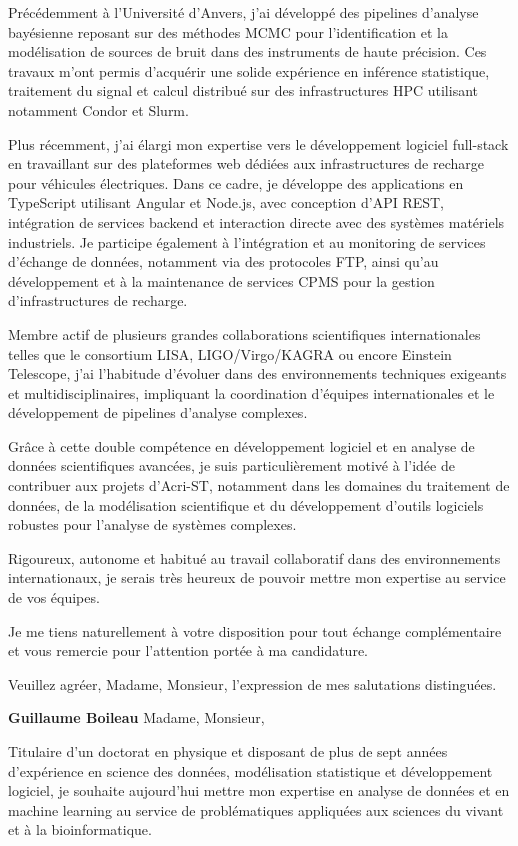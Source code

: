 \documentclass[10pt,a4paper]{altacv}
\begin{document}
Précédemment à l’Université d’Anvers, j’ai développé des pipelines d’analyse bayésienne reposant sur des méthodes MCMC pour l’identification et la modélisation de sources de bruit dans des instruments de haute précision. Ces travaux m’ont permis d’acquérir une solide expérience en inférence statistique, traitement du signal et calcul distribué sur des infrastructures HPC utilisant notamment Condor et Slurm.

Plus récemment, j’ai élargi mon expertise vers le développement logiciel full-stack en travaillant sur des plateformes web dédiées aux infrastructures de recharge pour véhicules électriques. Dans ce cadre, je développe des applications en TypeScript utilisant Angular et Node.js, avec conception d’API REST, intégration de services backend et interaction directe avec des systèmes matériels industriels. Je participe également à l’intégration et au monitoring de services d’échange de données, notamment via des protocoles FTP, ainsi qu’au développement et à la maintenance de services CPMS pour la gestion d’infrastructures de recharge.

Membre actif de plusieurs grandes collaborations scientifiques internationales telles que le consortium LISA, LIGO/Virgo/KAGRA ou encore Einstein Telescope, j’ai l’habitude d’évoluer dans des environnements techniques exigeants et multidisciplinaires, impliquant la coordination d’équipes internationales et le développement de pipelines d’analyse complexes.

Grâce à cette double compétence en développement logiciel et en analyse de données scientifiques avancées, je suis particulièrement motivé à l’idée de contribuer aux projets d’Acri-ST, notamment dans les domaines du traitement de données, de la modélisation scientifique et du développement d’outils logiciels robustes pour l’analyse de systèmes complexes.

Rigoureux, autonome et habitué au travail collaboratif dans des environnements internationaux, je serais très heureux de pouvoir mettre mon expertise au service de vos équipes.

Je me tiens naturellement à votre disposition pour tout échange complémentaire et vous remercie pour l’attention portée à ma candidature.

Veuillez agréer, Madame, Monsieur, l’expression de mes salutations distinguées.

\textbf{Guillaume Boileau}
Madame, Monsieur,

Titulaire d’un doctorat en physique et disposant de plus de sept années d’expérience en science des données, modélisation statistique et développement logiciel, je souhaite aujourd’hui mettre mon expertise en analyse de données et en machine learning au service de problématiques appliquées aux sciences du vivant et à la bioinformatique.
\end{document}
